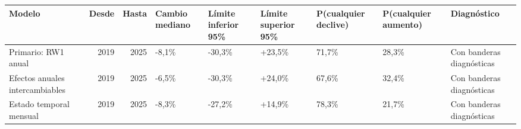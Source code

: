 \begin{tabular}{lrrllllll}
\toprule
Modelo & Desde & Hasta & Cambio mediano & Límite inferior 95\% & Límite superior 95\% & P(cualquier declive) & P(cualquier aumento) & Diagnóstico \\
\midrule
Primario: RW1 anual & 2019 & 2025 & -8,1\% & -30,3\% & +23,5\% & 71,7\% & 28,3\% & Con banderas diagnósticas \\
Efectos anuales intercambiables & 2019 & 2025 & -6,5\% & -30,3\% & +24,0\% & 67,6\% & 32,4\% & Con banderas diagnósticas \\
Estado temporal mensual & 2019 & 2025 & -8,3\% & -27,2\% & +14,9\% & 78,3\% & 21,7\% & Con banderas diagnósticas \\
\bottomrule
\end{tabular}
